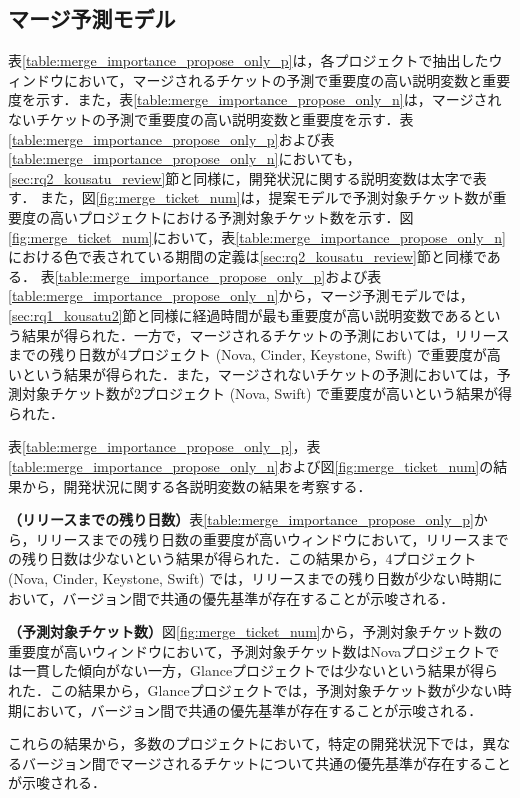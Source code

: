 \documentclass[submit]{ipsj}
\begin{document}
\subsection{マージ予測モデル}
表\ref{table:merge_importance_propose_only_p}は，各プロジェクトで抽出したウィンドウにおいて，マージされるチケットの予測で重要度の高い説明変数と重要度を示す．また，表\ref{table:merge_importance_propose_only_n}は，マージされないチケットの予測で重要度の高い説明変数と重要度を示す．表\ref{table:merge_importance_propose_only_p}および表\ref{table:merge_importance_propose_only_n}においても，\ref{sec:rq2_kousatu_review}節と同様に，開発状況に関する説明変数は太字で表す．
また，図\ref{fig:merge_ticket_num}は，提案モデルで予測対象チケット数が重要度の高いプロジェクトにおける予測対象チケット数を示す．図\ref{fig:merge_ticket_num}において，表\ref{table:merge_importance_propose_only_n}における色で表されている期間の定義は\ref{sec:rq2_kousatu_review}節と同様である．
表\ref{table:merge_importance_propose_only_p}および表\ref{table:merge_importance_propose_only_n}から，マージ予測モデルでは，\ref{sec:rq1_kousatu2}節と同様に経過時間が最も重要度が高い説明変数であるという結果が得られた．一方で，マージされるチケットの予測においては，リリースまでの残り日数が4プロジェクト (Nova, Cinder, Keystone, Swift) で重要度が高いという結果が得られた．また，マージされないチケットの予測においては，予測対象チケット数が2プロジェクト (Nova, Swift) で重要度が高いという結果が得られた．

表\ref{table:merge_importance_propose_only_p}，表\ref{table:merge_importance_propose_only_n}および図\ref{fig:merge_ticket_num}の結果から，開発状況に関する各説明変数の結果を考察する．

\textbf{（リリースまでの残り日数）}表\ref{table:merge_importance_propose_only_p}から，リリースまでの残り日数の重要度が高いウィンドウにおいて，リリースまでの残り日数は少ないという結果が得られた．この結果から，4プロジェクト (Nova, Cinder, Keystone, Swift) では，リリースまでの残り日数が少ない時期において，バージョン間で共通の優先基準が存在することが示唆される．

\textbf{（予測対象チケット数）}図\ref{fig:merge_ticket_num}から，予測対象チケット数の重要度が高いウィンドウにおいて，予測対象チケット数はNovaプロジェクトでは一貫した傾向がない一方，Glanceプロジェクトでは少ないという結果が得られた．この結果から，Glanceプロジェクトでは，予測対象チケット数が少ない時期において，バージョン間で共通の優先基準が存在することが示唆される．

これらの結果から，多数のプロジェクトにおいて，特定の開発状況下では，異なるバージョン間でマージされるチケットについて共通の優先基準が存在することが示唆される．
\end{document}
